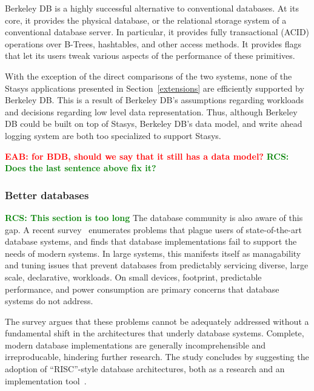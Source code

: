 \documentclass[letterpaper,twocolumn,10pt]{article}
\newcommand{\yad}{Stasys\xspace}
\newcommand{\eab}[1]{\textcolor{red}{\bf EAB: #1}}
\newcommand{\rcs}[1]{\textcolor{green}{\bf RCS: #1}}
\begin{document}
Berkeley DB is a highly successful alternative to conventional
databases.  At its core, it provides the physical database, or
the relational storage system of a conventional database server.
In particular, 
it provides fully transactional (ACID) operations over B-Trees, 
hashtables, and other access methods.  It provides flags that 
let its users tweak various aspects of the performance of these
primitives.~\cite{libtp}

With the
exception of the direct comparisons of the two systems, none of the \yad 
applications presented in Section~\ref{extensions} are efficiently
supported by Berkeley DB.   This is a result of Berkeley DB's  
assumptions regarding workloads and decisions regarding low level data
representation.  Thus, although Berkeley DB could be built on top of \yad,
Berkeley DB's data model, and write ahead logging system are both too specialized to support \yad.

\eab{for BDB, should we say that it still has a data model?} \rcs{ Does the last sentence above fix it?}




\subsubsection{Better databases}

\rcs{This section is too long}
The database community is also aware of this gap. 
A recent survey~\cite{riscDB} enumerates problems that plague users of
state-of-the-art database systems, and finds that database implementations fail to support the
needs of modern systems.  In large systems, this manifests itself as
managability and tuning issues that prevent databases from predictably
servicing diverse, large scale, declarative, workloads.  
On small devices, footprint, predictable performance, and power consumption are
primary concerns that database systems do not address.


The survey argues that these problems cannot be adequately addressed without a fundamental shift in the architectures that underly database systems.  Complete, modern database
implementations are generally incomprehensible and
irreproducable, hindering further research.  The study concludes 
by suggesting the adoption of ``RISC''-style database architectures, both as a research and an
implementation tool~\cite{riscDB}.  
\end{document}

